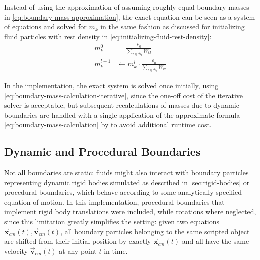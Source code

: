 \documentclass[oneside, a4paper]{book}
\newcommand\vek[1]{\vec{\bm{#1}}}
\begin{document}
    Instead of using the approximation of assuming roughly equal boundary masses in \autoref{eq:boundary-mass-approximation}, the exact equation can be seen as a system of equations and solved for $m_k$ in the same fashion as discussed for initializing fluid particles with rest density in \autoref{eq:initializing-fluid-rest-density}:
    \begin{align}
      m_k^0 &= \frac{\rho_0}{\sum_{l\in\mathcal{B}_k} W_{kl}}\\
      m_k^{l+1} &\gets m_k^l \cdot \frac{\rho_0}{\sum_{l\in\mathcal{B}_k} W_{kl}}\label{eq:boundary-mass-calculation-iterative}
    \end{align}

    In the implementation, the exact system is solved once initially, using \autoref{eq:boundary-mass-calculation-iterative}, since the one-off cost of the iterative solver is acceptable, but subsequent recalculations of masses due to dynamic boundaries are handled with a single application of the approximate formula \autoref{eq:boundary-mass-calculation} by \autocite[Akinci et al.]{versatile-boundary-akinci} to avoid additional runtime cost.
    
    \subsection{Dynamic and Procedural Boundaries}\label{sec:dynamic-and-procedural-bdy}
    Not all boundaries are static: fluids might also interact with boundary particles representing dynamic rigid bodies simulated as described in \autoref{sec:rigid-bodies} or procedural boundaries, which behave according to some analytically specified equation of motion. In this implementation, procedural boundaries that implement rigid body translations were included, while rotations where neglected, since this limitation greatly simplifies the setting: given two equations $\vek{x}_{cm}(t), \vek{v}_{cm}(t)$, all boundary particles belonging to the same scripted object are shifted from their initial position by exactly $\vek{x}_{cm}(t)$ and all have the same velocity $\vek{v}_{cm}(t)$ at any point $t$ in time. 
\end{document}
